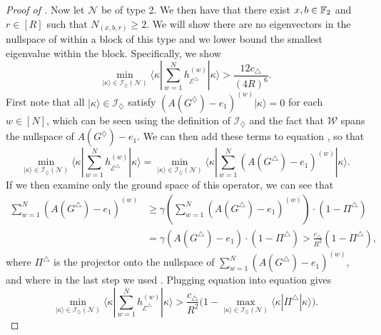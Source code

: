 \documentclass[../thesis-main/thesis-main]{subfiles}
\begin{document}
\begin{proof}[Proof of \protect{}]
\noindent Now let $\mathcal{N}$ be of type 2.  We then have that there exist $x,b\in\mathbb{F}_2$ and $r\in[R]$ such that $N_{(x,b,r)}\geq2$. We will show there are no eigenvectors in the nullspace of  within a block of this type and we lower bound the smallest eigenvalue within the block. Specifically, we show
\begin{equation}
  \min_{|\kappa\rangle\in\mathcal{I}_{\diamondsuit}(\mathcal{N})}\langle\kappa|\sum_{w=1}^{N}h_{\mathcal{E}^{\triangle}}^{(w)}|\kappa\rangle >\frac{12c_{\triangle}}{(4R)^6}.\label{eq:boundfortype2}
\end{equation}
First note that all $|\kappa\rangle\in\mathcal{I}_{\diamondsuit}$ satisfy $(A(G^{\diamondsuit})-e_{1})^{(w)}|\kappa\rangle=0$ for each $w\in [N]$, which can be seen using the definition of $\mathcal{I}_{\diamondsuit}$ and the fact that $\mathcal{W}$ spans the nullspace of $A(G^{\diamondsuit})-e_{1}$. We can then add these terms to equation , so that
\begin{equation}
  \min_{|\kappa\rangle\in\mathcal{I}_{\diamondsuit}(\mathcal{N})}\langle\kappa|\sum_{w=1}^{N}h_{\mathcal{E}^{\triangle}}^{(w)}|\kappa\rangle=\min_{|\kappa\rangle\in\mathcal{I}_{\diamondsuit}(\mathcal{N})}\langle\kappa|\sum_{w=1}^{N}\left(A(G^{\triangle})-e_{1}\right)^{(w)}|\kappa\rangle.\label{eq:min_over_blockFbl}
\end{equation}
If we then examine only the ground space of this operator, we can see that
\begin{align}
  \sum_{w=1}^{N}\left(A(G^{\triangle})-e_{1}\right)^{(w)}
  & \geq\gamma\left(\sum_{w=1}^{N}\left(A(G^{\triangle})-e_{1}\right)^{(w)}\right)\cdot
    \left(1-\Pi^{\triangle}\right) \nonumber \\
  &= \gamma(A(G^{\triangle})-e_{1})\cdot\left(1-\Pi^{\triangle}\right)
   > \frac{c_{\triangle}}{R^{2}}\left(1-\Pi^{\triangle}\right),
\label{eq:op_ineq_A_Gtriangle}
\end{align}
where $\Pi^{\triangle}$ is the projector onto the nullspace of $\sum_{w=1}^{N}\left(A(G^{\triangle})-e_{1}\right)^{(w)}$, and where in the last step we used . Plugging equation  into equation  gives
\begin{equation}
  \min_{|\kappa\rangle\in\mathcal{I}_{\diamondsuit}(\mathcal{N})}\langle\kappa|\sum_{w=1}^{N}h_{\mathcal{E}^{\triangle}}^{(w)}|\kappa\rangle>\frac{c_{\triangle}}{R^{2}}\Big(1-\max_{|\kappa\rangle\in\mathcal{I}_{\diamondsuit}(\mathcal{N})}\langle\kappa|\Pi^{\triangle}|\kappa\rangle\Big).\label{eq:bound1}
\end{equation}


\end{proof}
\end{document}
